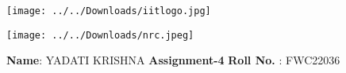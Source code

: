 \documentclass[10pt,a4paper]{report}
\begin{document}
\begin{figure*}[!tbp]
  \centering
  \begin{minipage}[b]{0.4\textwidth}
 \texttt{[image: ../../Downloads/iitlogo.jpg]} 
  \end{minipage}
  \hfill
  \vspace{5mm}\begin{minipage}[b]{0.4\textwidth}
\raggedleft  \texttt{[image: ../../Downloads/nrc.jpeg]} 

  \end{minipage}\vspace{0.2cm}
\end{figure*}
\raggedright \textbf{Name}:\hspace{1mm} YADATI KRISHNA\hspace{3cm} \Large \textbf{Assignment-4}\hspace{2.5cm} %
\normalsize \textbf{Roll No.} :\hspace{1mm} FWC22036\vspace{1cm}
\end{document}
